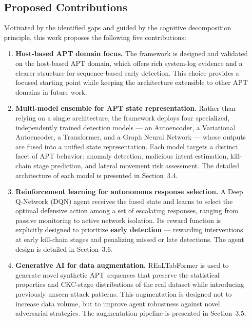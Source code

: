 \subsection{Proposed Contributions}

Motivated by the identified gaps and guided by the cognitive decomposition principle, this work proposes the following five contributions:

\begin{enumerate}

    \item \textbf{Host-based APT domain focus.}
    The framework is designed and validated on the host-based APT domain, which offers rich system-log evidence and a clearer structure for sequence-based early detection. This choice provides a focused starting point while keeping the architecture extensible to other APT domains in future work.

    \item \textbf{Multi-model ensemble for APT state representation.}
    Rather than relying on a single architecture, the framework deploys four specialized, independently trained detection models --- an Autoencoder, a Variational Autoencoder, a Transformer, and a Graph Neural Network --- whose outputs are fused into a unified state representation. Each model targets a distinct facet of APT behavior: anomaly detection, malicious intent estimation, kill-chain stage prediction, and lateral movement risk assessment. The detailed architecture of each model is presented in Section~3.4.

    \item \textbf{Reinforcement learning for autonomous response selection.}
    A Deep Q-Network (DQN) agent receives the fused state and learns to select the optimal defensive action among a set of escalating responses, ranging from passive monitoring to active network isolation. Its reward function is explicitly designed to prioritize \textbf{early detection} --- rewarding interventions at early kill-chain stages and penalizing missed or late detections. The agent design is detailed in Section~3.6.

    \item \textbf{Generative AI for data augmentation.}
    REaLTabFormer is used to generate novel synthetic APT sequences that preserve the statistical properties and CKC-stage distributions of the real dataset while introducing previously unseen attack patterns. This augmentation is designed not to increase data volume, but to improve agent robustness against novel adversarial strategies. The augmentation pipeline is presented in Section~3.5.


\end{enumerate}
